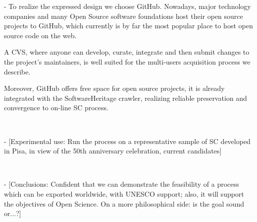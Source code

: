 \documentclass[a4paper]{article}
\begin{document}
 - To realize the expressed design we choose GitHub. Nowadays, major technology companies and many Open Source software foundations host their open source projects to GitHub, which currently is by far the most popular place to host open source code on the web.

A CVS, where anyone can develop, curate, integrate and then submit changes to the project's maintainers, is well suited for the multi-users acquisition process we describe.

Moreover, GitHub offers free space for open source projects, it is already integrated with the SoftwareHeritage crawler, realizing reliable preservation and convergence to on-line SC process.

\

 - [Experimental use: Run the process on a representative sample of SC developed in Pisa, in view of the 50th anniversary celebration, current candidates] 

\

 - [Conclusions: Confident that we can demonstrate the feasibility of a process which can be exported worldwide, with UNESCO support; also, it will support the objectives of Open Science. On a more philosophical side: is the goal sound or...?] 

\


\nocite{*}
\printbibliography



	
	
\end{document}
